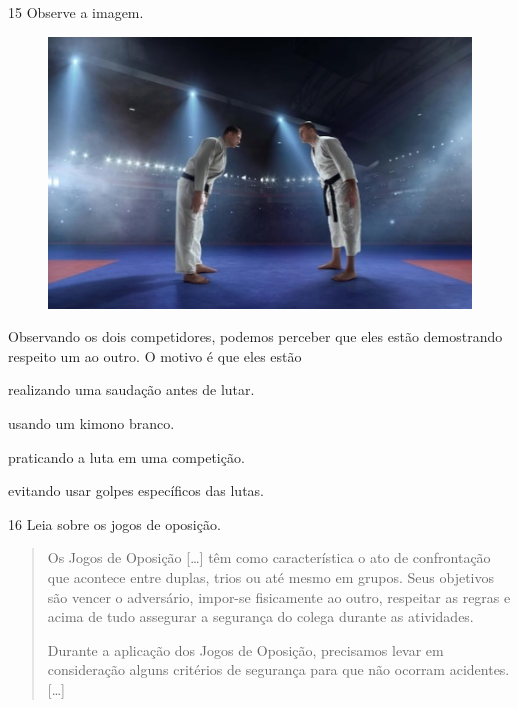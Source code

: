 \num{15} Observe a imagem.
  \begin{figure}[htpb!]
\includegraphics[width=\textwidth]{./imgs/img14.jpg}
\end{figure}

\noindent{}Observando os dois competidores, podemos perceber que eles estão
demostrando respeito um ao outro. O motivo é que eles estão

\begin{escolha}
\item realizando uma saudação antes de lutar.

\item usando um kimono branco.

\item praticando a luta em uma competição.

\item evitando usar golpes específicos das lutas.
\end{escolha}


\num{16} Leia sobre os jogos de oposição.
\begin{quote}
  Os Jogos de Oposição {[}\ldots{}{]} têm como característica o ato de
  confrontação que acontece entre duplas, trios ou até mesmo em grupos.
  Seus objetivos são vencer o adversário, impor-se fisicamente ao outro,
  respeitar as regras e acima de tudo assegurar a segurança do colega
  durante as atividades.

Durante a aplicação dos Jogos de Oposição, precisamos levar em
consideração alguns critérios de segurança para que não ocorram
acidentes. {[}\ldots{}{]}

\end{quote}

